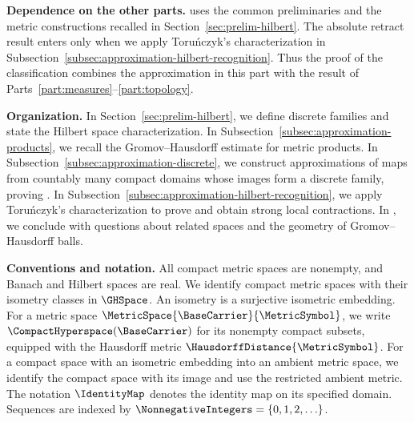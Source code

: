 \medskip
\noindent\textbf{Dependence on the other parts.}
 uses the common preliminaries
and the metric constructions recalled in Section~\ref{sec:prelim-hilbert}.
The absolute retract result  enters only when we
apply Toru\'nczyk's characterization in
Subsection~\ref{subsec:approximation-hilbert-recognition}.
Thus the proof of the classification combines the approximation in this
part with the result of Parts~\ref{part:measures}--\ref{part:topology}.

\medskip
\noindent\textbf{Organization.}
In Section~\ref{sec:prelim-hilbert},
we define discrete families and state the Hilbert space characterization.
In Subsection~\ref{subsec:approximation-products},
we recall the Gromov--Hausdorff estimate for metric products.
In Subsection~\ref{subsec:approximation-discrete},
we construct approximations of maps from countably many
compact domains whose images form a discrete family,
proving .
In Subsection~\ref{subsec:approximation-hilbert-recognition},
we apply Toru\'nczyk's characterization to prove
 and obtain strong local contractions.
In ,
we conclude with questions about related spaces
and the geometry of Gromov--Hausdorff balls.

\medskip
\noindent\textbf{Conventions and notation.}
All compact metric spaces are nonempty,
and Banach and Hilbert spaces are real.
We identify compact metric spaces with their isometry classes in
$\GHSpace$.
An isometry is a surjective isometric embedding.
For a metric space
$\MetricSpace{\BaseCarrier}{\MetricSymbol}$,
we write
$\CompactHyperspace(\BaseCarrier)$
for its nonempty compact subsets,
equipped with the Hausdorff metric
$\HausdorffDistance{\MetricSymbol}$.
For a compact space with an isometric embedding into an ambient metric space,
we identify the compact space with its image and use the restricted ambient metric.
The notation
$\IdentityMap$
denotes the identity map on its specified domain.
Sequences are indexed by
$\NonnegativeIntegers=\{0,1,2,\ldots\}$.
